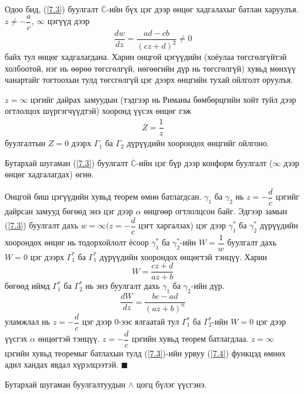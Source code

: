 Одоо бид, (\ref{7.3}) буулгалт $\overline{\mathbb{C}}$-ийн бүх цэг дээр өнцөг хадгалахыг батлан харуулъя. $z\neq -\dfrac{a}{c}$, $\infty$ цэгүүд дээр 
$$\frac{dw}{dz}=\frac{ad-cb}{(cz+d)^2}\neq 0$$
байх тул өнцөг хадгалагдана. Харин онцгой цэгүүдийн (хоёулаа төгсгөлгүйтэй холбоотой, нэг нь өөрөө төгсгөлгүй, нөгөөгийн дүр нь төгсгөлгүй) хувьд мөнхүү чанартайг тогтоохын тулд төгсгөлгүй цэг дээрх өнцгийн тухай ойлголт оруулъя.
\begin{dfn}
$z=\infty$ цэгийг дайрах замуудын (тэдгээр нь Риманы бөмбөрцгийн хойт туйл дээр огтлолцох шүргэгчүүдтэй) хооронд үүсэх өнцөг гэж
\begin{eqnarray}
Z=\dfrac{1}{z}
\end{eqnarray}
буулгалтын $Z=0$ дээрх $\Gamma_1$ ба $\Gamma_2$  дүрүүдийн хоорондох өнцгийг ойлгоно.
\end{dfn}
\begin{thm}
Бутархай шугаман (\ref{7.3}) буулгалт $\overline{\mathbb{C}}$-ийн цэг бүр дээр конформ буулгалт ($\infty$ дээр өнцөг хадгалагдах) өгнө.
\end{thm}
\begin{prf}
Онцгой биш цэгүүдийн хувьд теорем өмнө батлагдсан. $\gamma_1$ ба $\gamma_2$ нь $z=-\dfrac{d}{c}$ цэгийг дайрсан замууд бөгөөд энэ цэг дээр $\alpha$ өнцгөөр огтлолцсон байг. Эдгээр замын (\ref{7.3}) буулгалт дахь $w=\infty(z=-\dfrac{d}{c}$ цэгт харгалзах) цэг дээр $\gamma_1^*$ ба $\gamma_2^*$ дүрүүдийн хоорондох өнцөг нь тодорхойлолт ёсоор $\gamma_1^*$ ба $\gamma_2^*$-ийн $W=\dfrac{1}{w}$ буулгалт дахь $W=0$ цэг дээрх $\Gamma^*_1$ ба $\Gamma_1^*$ дүрүүдийн хоорондох өнцөгтэй тэнцүү. Харин
$$W=\frac{cz+d}{az+b}$$
бөгөөд иймд $\Gamma_1^*$ ба $\Gamma_2^*$ нь энэ буулгалт дахь $\gamma_1$ ба $\gamma_2$-ийн дүр.
$$\frac{dW}{dz}=\frac{bc-ad}{(az+b)^n}$$
уламжлал нь $z=-\dfrac{d}{c}$ цэг дээр $0$-ээс ялгаатай тул  $\Gamma_1^*$ ба $\Gamma_2^*$-ийн $W=0$ цэг дээр үүсгэх $\alpha$ өнцөгтэй тэнцүү. $z=-\dfrac{d}{c}$ цэгийн хувьд теорем батлагдлаа. $z=\infty$ цэгийн хувьд теоремыг батлахын тулд (\ref{7.3})-ийн урвуу (\ref{7.4}) функцэд өмнөх адил хандах явдал хүрэлцээтэй.
\hfill $\blacksquare$\end{prf}
\begin{thm}
Бутархай шугаман буулгалтуудын $\wedge$ цогц бүлэг үүсгэнэ.
\end{thm}
